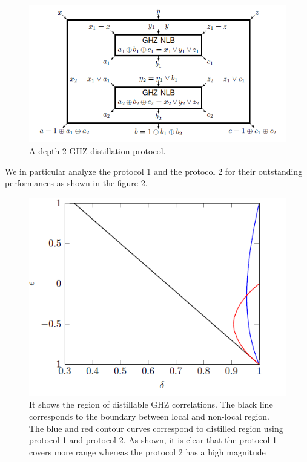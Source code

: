 \documentclass[aps,prl,twocolumn,groupedaddress]{revtex4}
\begin{document}
\begin{figure}[t]
\includegraphics[scale=0.6]{ghz.png}   
\caption[A depth $2$ GHZ distillation protocol.]{A depth $2$ GHZ distillation protocol.}
\label{figure:generic}
\end{figure}

We in particular analyze the protocol 1 and the protocol 2 for their outstanding performances as shown in the  figure 2. 

\begin{figure}[t]
\includegraphics[scale=0.6]{distillation_range.png}   
\caption[It shows the region of distillable GHZ correlations. The black line corresponds to the boundary between local and non-local region. The blue and red contour curves correspond to distilled region using protocol 1 and protocol 2. As shown, it is clear that the protocol 1 covers more range whereas the protocol 2 has a high magnitude]{It shows the region of distillable GHZ correlations. The black line corresponds to the boundary between local and non-local region. The blue and red contour curves correspond to distilled region using protocol 1 and protocol 2. As shown, it is clear that the protocol 1 covers more range whereas the protocol 2 has a high magnitude}
\label{figure:generic2}
\end{figure}
\end{document}
